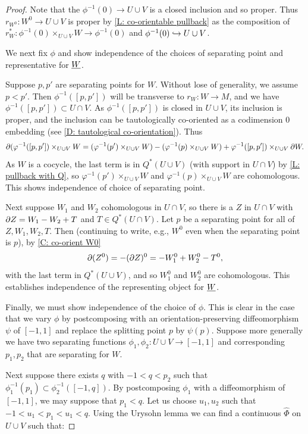 \begin{proof}
Note that the $\phi^{-1}(0) \to U \cup V$ is a closed inclusion and so proper. Thus $r_{W^0}:W^0 \to U \cup V$ is proper by \cref{L: co-orientable pullback} as the composition of $r_W^*:\phi^{-1}(0)\times_{U \cup V}W \to \phi^{-1}(0)$ and $\phi^{-1}(0)\hookrightarrow U \cup V$.


We next fix $\phi$ and show independence of the choices of separating point and representative for $\underline{W}$.

Suppose $p,p'$ are separating points for $W$. Without lose of generality, we assume $p<p'$. Then $\phi^{-1}([p,p'])$ will be transverse to $r_W \colon W \to M$, and we have $\phi^{-1}([p,p']) \subset U \cap V$. As $\phi^{-1}([p,p'])$ is closed in $U \cup V$, its inclusion is proper, and the inclusion can be tautologically co-oriented as a codimension $0$ embedding (see \cref{D: tautological co-orientation}).
Thus $$\partial(\varphi^{-1}([p,p'])\times_{U \cup V} W = (\varphi^{-1}(p')\times_{U \cup V} W)-(\varphi^{-1}(p)\times_{U \cup V} W)+ \varphi^{-1}([p,p'])\times_{U \cup V} \partial W.$$ As $W$ is a cocycle, the last term is in $Q^*(U \cup V)$ (with support in $U \cap V$) by \cref{L: pullback with Q}, so $\varphi^{-1}(p')\times_{U \cup V} W$ and $\varphi^{-1}(p)\times_{U \cup V} W$ are cohomologous. This shows independence of choice of separating point.

Next suppose $W_1$ and $W_2$ cohomologous in $U \cap V$, so there is a $Z$ in $U \cap V$ with $\partial Z = W_1-W_2+T$ and $T \in Q^*(U \cap V)$. Let $p$ be a separating point for all of $Z,W_1,W_2,T$. Then (continuing to write, e.g., $W^0$ even when the separating point is $p$), by \cref{C: co-orient W0} $$\partial (Z^0) = -(\partial Z)^0 = -W_1^0+W_2^0-T^0,$$ with the last term in $Q^*(U \cup V)$, and so $W_1^0$ and $W_2^0$ are cohomologous. This establishes independence of the representing object for $\underline{W}$.

Finally, we must show independence of the choice of $\phi$. This is clear in the case that we vary $\phi$ by postcomposing with an orientation-preserving diffeomorphism $\psi$ of $[-1,1]$ and replace the splitting point $p$ by $\psi(p)$.
Suppose more generally we have two separating functions $\phi_1,\phi_2:U \cup V \to [-1,1]$ and corresponding $p_1,p_2$ that are separating for $W$.

Next suppose there exists $q$ with $-1<q<p_2$ such that $\phi_1^{-1}(p_1) \subset \phi_2^{-1}([-1,q])$. By postcomposing $\phi_1$ with a diffeomorphism of $[-1,1]$, we may suppose that $p_1<q$. Let us choose $u_1,u_2$ such that $-1<u_1<p_1<u_1<q$. Using the Urysohn lemma we can find a continuous $\hat \Phi$ on $U \cup V$ such that:


\end{proof}
